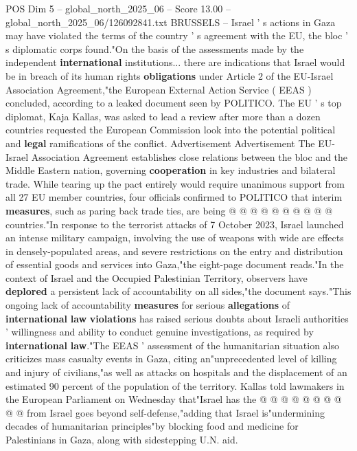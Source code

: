\begin{textsample}{POS Dim 5 – global\_north\_2025\_06 – Score 13.00 – global\_north\_2025\_06/126092841.txt}  \label{ex:f5_pos_087}
BRUSSELS -- Israel ' s actions in Gaza may have violated the terms of the country ' s agreement with the EU, the bloc ' s diplomatic corps found."On the basis of the assessments made by the independent \textbf{international} institutions... there are indications that Israel would be in breach of its human rights \textbf{obligations} under Article 2 of the EU-Israel Association Agreement,"the European External Action Service ( EEAS ) concluded, according to a leaked document seen by POLITICO.
The EU ' s top diplomat, Kaja Kallas, was asked to lead a review after more than a dozen countries requested the European Commission look into the potential political and \textbf{legal} ramifications of the conflict.
Advertisement Advertisement The EU-Israel Association Agreement establishes close relations between the bloc and the Middle Eastern nation, governing \textbf{cooperation} in key industries and bilateral trade.
While tearing up the pact entirely would require unanimous support from all 27 EU member countries, four officials confirmed to POLITICO that interim \textbf{measures}, such as paring back trade ties, are being @ @ @ @ @ @ @ @ @ @ countries."In response to the terrorist attacks of 7 October 2023, Israel launched an intense military campaign, involving the use of weapons with wide are effects in densely-populated areas, and severe restrictions on the entry and distribution of essential goods and services into Gaza,"the eight-page document reads."In the context of Israel and the Occupied Palestinian Territory, observers have \textbf{deplored} a persistent lack of accountability on all sides,"the document says."This ongoing lack of accountability \textbf{measures} for serious \textbf{allegations} of \textbf{international} \textbf{law} \textbf{violations} has raised serious doubts about Israeli authorities ' willingness and ability to conduct genuine investigations, as required by \textbf{international} \textbf{law}."The EEAS ' assessment of the humanitarian situation also criticizes mass casualty events in Gaza, citing an"unprecedented level of killing and injury of civilians,"as well as attacks on hospitals and the displacement of an estimated 90 percent of the population of the territory.
Kallas told lawmakers in the European Parliament on Wednesday that"Israel has the @ @ @ @ @ @ @ @ @ @ from Israel goes beyond self-defense,"adding that Israel is"undermining decades of humanitarian principles"by blocking food and medicine for Palestinians in Gaza, along with sidestepping U.N. aid.

\end{textsample}
